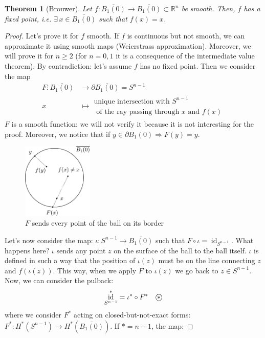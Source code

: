 \documentclass[a4paper,11pt,titlepage, article, oneside]{memoir}
\numberwithin{equation}{section}
\newtheorem{theorem}{Theorem}[section]
\theoremstyle{definition}
\theoremstyle{remark}
\DeclareMathOperator{\id}{id}
\newcommand{\rfield}{\mathbb{R}}
\newcommand\oast{\stackMath\mathbin{\stackinset{c}{0ex}{c}{0ex}{\ast}{\bigcirc}}}
\begin{document}
\begin{theorem}[Brouwer] \label{brouwerthm}
Let $f \colon \overline{B_1(0)} \rightarrow \overline{B_1(0)} \subset \rfield^n$ be smooth. Then, $f$ has a fixed point, i.e. $\exists \, x \in \overline{B_1(0)}$ such that $f(x)=x$.
\end{theorem}

\begin{proof}
Let's prove it for $f$ smooth. If $f$ is continuous but not smooth, we can approximate it using smooth maps (Weierstrass approximation). Moreover, we will prove it for $n \ge 2$ (for $n=0, 1$ it is a consequence of the intermediate value theorem).
By contradiction: let's assume $f$ has no fixed point. Then we consider the map
\begin{align*}F \colon \overline{B_1(0)} &\rightarrow \partial \overline{B_1(0)} = S^{n-1} \\
x &\mapsto \substack{\text{unique intersection with }S^{n-1} \\ \text{ of the ray passing through }x \text{ and } f(x)}
\end{align*}
$F$ is a smooth function: we will not verify it because it is not interesting for the proof. Moreover, we notice that if $y \in \partial \overline{B_1(0)} \Rightarrow F(y) = y$.
\begin{figure}[H] \label{Fig:ball10}
     \centering
     \includegraphics[width=0.3\textwidth]{Images/B_10.pdf}
     \caption{$F$ sends every point of the ball on its border}
\end{figure}
Let's now consider the map: $\iota \colon S^{n-1} \rightarrow \overline{B_1(0)}$ such that $F \circ \iota = \id_{S^{n-1}}$. What happens here? $\iota$ sends any point $z$ on the surface of the ball to the ball itself. $\iota$ is defined in such a way that the position of $\iota(z)$ must be on the line connecting $z$ and $f(\iota(z))$. This way, when we apply $F$ to $\iota(z)$ we go back to $z \in S^{n-1}$. Now, we can consider the pulback:
$$\id_{S^{n-1}}^* = \iota^* \circ F^* \quad \oast$$
where we consider $F^*$ acting on closed-but-not-exact forms: $F^* \colon H^*(S^{n-1}) \rightarrow H^*(\overline{B_1(0)})$. If $* = n-1$, the map:

\end{proof}
\end{document}
